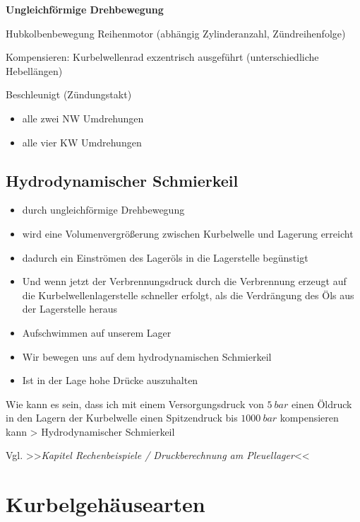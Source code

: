 \textbf{Ungleichförmige Drehbewegung}

Hubkolbenbewegung Reihenmotor (abhängig Zylinderanzahl, Zündreihenfolge)

Kompensieren: Kurbelwellenrad exzentrisch ausgeführt (unterschiedliche
Hebellängen)

Beschleunigt (Zündungstakt)

\begin{itemize}
\item
  alle zwei NW Umdrehungen
\item
  alle vier KW Umdrehungen
\end{itemize}

\subsection{Hydrodynamischer
Schmierkeil}\label{hydrodynamischer-schmierkeil}

\begin{itemize}
\item
  durch ungleichförmige Drehbewegung
\item
  wird eine Volumenvergrößerung zwischen Kurbelwelle und Lagerung
  erreicht
\item
  dadurch ein Einströmen des Lageröls in die Lagerstelle begünstigt
\item
  Und wenn jetzt der Verbrennungsdruck durch die Verbrennung erzeugt auf
  die Kurbelwellenlagerstelle schneller erfolgt, als die Verdrängung des
  Öls aus der Lagerstelle heraus
\item
  Aufschwimmen auf unserem Lager
\item
  Wir bewegen uns auf dem hydrodynamischen Schmierkeil
\item
  Ist in der Lage hohe Drücke auszuhalten
\end{itemize}

Wie kann es sein, dass ich mit einem Versorgungsdruck von $5~bar$
einen Öldruck in den Lagern der Kurbelwelle einen Spitzendruck bis
$1000~bar$ kompensieren kann > Hydrodynamischer
Schmierkeil

Vgl. >>\emph{Kapitel Rechenbeispiele / Druckberechnung am Pleuellager}<<

\section{Kurbelgehäusearten}\label{kurbelgehaeusearten}

